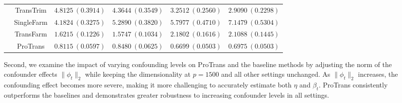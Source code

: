 \documentclass[12pt]{article}
\begin{document}
\begin{table}[!ht]
\begin{tabular}{cccccc}
        & TransTrim   & $4.8125\ (0.3914)$  & $4.3644\ (0.3549)$ & $3.2512\ (0.2560)$ & $2.9090\ (0.2298)$ \\
        & SingleFarm  & $4.1824\ (0.3275)$  & $5.2890\ (0.3820)$ & $5.7977\ (0.4710)$  & $7.1479\ (0.5304)$ \\
        & TransFarm   & $1.6215\ (0.1226)$ & $1.5747\ (0.1034)$ & $2.1802\ (0.1616)$  & $2.1088\ (0.1445)$ \\
        & ProTrans   & $\bm{0.8115}\ (0.0597)$ & $\bm{0.8480}\ (0.0625)$ & $\bm{0.6699}\ (0.0503)$ & $\bm{0.6975}\ (0.0503)$ \\
        \bottomrule
    \end{tabular}
\end{table}


Second, we examine the impact of varying confounding levels on ProTrans and the baseline methods by adjusting the norm of the confounder effects $\|\phi_t\|_2$ while keeping the dimensionality at $p = 1500$ and all other settings unchanged. As $\|\phi_t\|_2$ increases, the confounding effect becomes more severe, making it more challenging to accurately estimate both $\eta$ and $\beta_t$. ProTrans consistently outperforms the baselines and demonstrates greater robustness to increasing confounder levels in all settings. 

\end{document}
